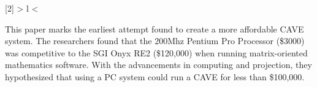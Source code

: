 \newcommand{\ns}{not specified}
\newcommand{\checkmark}{\ding{51}}
\newcommand{\cross}{\ding{55}}

\newcolumntype{R}[2]{%
	>{\bgroup}%
	l%
	<{\egroup}%
}
\newcommand*\rot{\multicolumn{1}{R{45}{1em}}}%


\label{chapter:affordableCAVEChapter}


%

This paper marks the earliest attempt found to create a more affordable CAVE system. The researchers found that the 200Mhz Pentium Pro Processor (\$3000) was competitive to the SGI Onyx RE2 (\$120,000) when running matrix-oriented mathematics software. With the advancements in computing and projection, they hypothesized that using a PC system could run a CAVE for less than \$100,000. \cite{wegman}

\filbreak
{}

